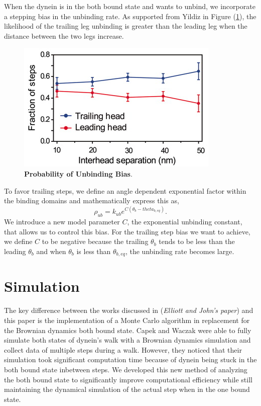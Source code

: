 When the dynein is in the both bound state and wants to unbind, we incorporate a stepping bias in the unbinding rate. As supported from Yildiz in Figure (\ref{fig:trailingbias}), the likelihood of the trailing leg unbinding is greater than the leading leg when the distance between the two legs increase. 


\begin{figure}[H]
	\centering
	\includegraphics[width=0.6\columnwidth]{Figures/trailingbias.png}
	\caption[Probability of Unbinding Bias]{\textbf{Probability of Unbinding Bias}\cite{Dewitt2012}.}
	\label{fig:trailingbias}
\end{figure}

To favor trailing steps, we define an angle dependent exponential factor within the binding domains and mathematically express this as,
\begin{equation}
	\rho_{ub}=k_{ub}e^{C(\theta_b-theta_{b,eq})}.
\end{equation}
We introduce a new model parameter $C$, the exponential unbinding constant, that allows us to control this bias. For the trailing step bias we want to achieve, we define $C$ to be negative because the trailing $\theta_b$ tends to be less than the leading $\theta_b$ and  when $\theta_b$ is less than $\theta_{b,eq}$, the unbinding rate becomes large.


\section{Simulation}

The key difference between the works discussed in \cite{Capek2017, } (\textit{Elliott and John's paper}) and this paper is the implementation of a Monte Carlo algorithm in replacement for the Brownian dynamics both bound state. Capek and Waczak were able to fully simulate both states of dynein's walk with a Brownian dynamics simulation and collect data of multiple steps during a walk. However, they noticed that their simulation took significant computation time because of dynein being stuck in the both bound state inbetween steps. We developed this new method of analyzing the both bound state to significantly improve computational efficiency while still maintaining the dynamical simulation of the actual step when in the one bound state. 


